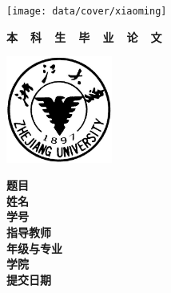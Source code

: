 \thispagestyle{empty}

{
\setlength{\parindent}{0em}
\renewcommand{\baselinestretch}{2}

\vspace*{0.1mm}

\begin{center}
  \texttt{[image: data/cover/xiaoming]}
\end{center}

\vspace{-14mm}

{
\renewcommand{\baselinestretch}{1.8}
\songti\erhao\bfseries
\centering
本~~科~~生~~毕~~业~~论~~文 \par
}

\vspace{1.5em}

\begin{center}
  \includegraphics[width=35mm]{data/cover/xiaobiao}
\end{center}

\vspace{8em}

{
\renewcommand{\baselinestretch}{1.7}
\songti\sanhao
\centering

\begin{flushleft}

\hspace{4.5em} \textbf{题目 \; \underline{\makebox[16em]{\zjutitlec}}} \\
\hspace{4.5em} \textbf{姓名 \; \underline{\makebox[16em]{\zjuauthornamec}}} \\
\hspace{4.5em} \textbf{学号 \; \underline{\makebox[16em]{\zjuauthorid}}} \\
\hspace{4.5em} \textbf{指导教师 \; \underline{\makebox[14em]{\zjumentorc}}} \\
\hspace{4.5em} \textbf{年级与专业 \; \underline{\makebox[13em]{\zjumajorc}}} \\
\hspace{4.5em} \textbf{学院 \; \underline{\makebox[16em]{\zjucollegec}}} \\
\hspace{4.5em} \textbf{提交日期 \; \underline{}} \par
\end{flushleft}
}
}
